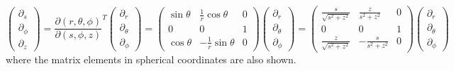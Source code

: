 \begin{equation}
    \begin{pmatrix} \partial_s \\ \partial_\phi \\ \partial_z \end{pmatrix} = \frac{\partial (r, \theta, \phi)}{\partial (s, \phi, z)}^T 
    \begin{pmatrix} \partial_r \\ \partial_\theta \\ \partial_\phi \end{pmatrix}
    = \begin{pmatrix}
        \sin\theta & \frac{1}{r}\cos\theta & 0 \\
        0 & 0 & 1 \\ 
        \cos\theta & -\frac{1}{r}\sin\theta & 0
    \end{pmatrix}
    \begin{pmatrix} \partial_r \\ \partial_\theta \\ \partial_\phi \end{pmatrix}
    = \begin{pmatrix}
        \frac{s}{\sqrt{s^2 + z^2}} & \frac{z}{s^2 + z^2} & 0 \\
        0 & 0 & 1 \\ 
        \frac{z}{\sqrt{s^2 + z^2}} & -\frac{s}{s^2 + z^2} & 0
    \end{pmatrix}
    \begin{pmatrix} \partial_r \\ \partial_\theta \\ \partial_\phi \end{pmatrix}
\end{equation}
where the matrix elements in spherical coordinates are also shown.
